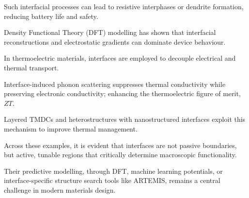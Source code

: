Such interfacial processes can lead to resistive interphases or dendrite formation, reducing battery life and safety.

Density Functional Theory (DFT) modelling has shown that interfacial reconstructions and electrostatic gradients can
dominate device behaviour.

\label{para:thermoelectric_interface} %

In thermoelectric materials, interfaces are employed to decouple electrical and thermal transport.

Interface-induced phonon scattering suppresses thermal conductivity while preserving electronic conductivity; enhancing
the thermoelectric figure of merit, $ZT$.

Layered TMDCs and heterostructures with nanostructured interfaces exploit this mechanism to improve thermal management.

\label{para:interfaces_active_modelling_challenge} %

Across these examples, it is evident that interfaces are not passive boundaries, but active, tunable regions that
critically determine macroscopic functionality.

Their predictive modelling, through DFT, machine learning potentials, or interface-specific structure search tools like
ARTEMIS, remains a central challenge in modern materials design.